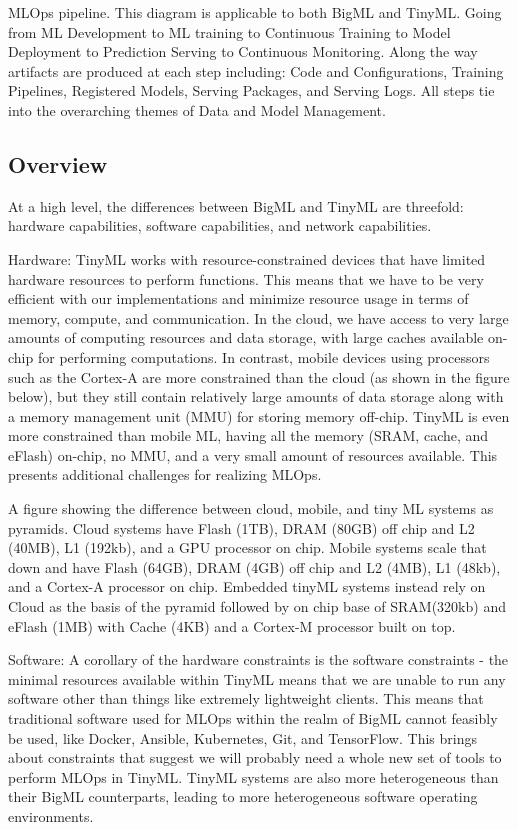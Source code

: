 MLOps pipeline. This diagram is applicable to both BigML and TinyML. Going from ML Development to ML training to Continuous Training to Model Deployment to Prediction Serving to Continuous Monitoring. Along the way artifacts are produced at each step including: Code and Configurations, Training Pipelines, Registered Models, Serving Packages, and Serving Logs. All steps tie into the overarching themes of Data and Model Management.



\subsection{Overview}

At a high level, the differences between BigML and TinyML are threefold: hardware capabilities, software capabilities, and network capabilities. 

Hardware: TinyML works with resource-constrained devices that have limited hardware resources to perform functions. This means that we have to be very efficient with our implementations and minimize resource usage in terms of memory, compute, and communication. In the cloud, we have access to very large amounts of computing resources and data storage, with large caches available on-chip for performing computations. In contrast, mobile devices using processors such as the Cortex-A are more constrained than the cloud (as shown in the figure below), but they still contain relatively large amounts of data storage along with a memory management unit (MMU) for storing memory off-chip. TinyML is even more constrained than mobile ML, having all the memory (SRAM, cache, and eFlash) on-chip, no MMU, and a very small amount of resources available. This presents additional challenges for realizing MLOps.

A figure showing the difference between cloud, mobile, and tiny ML systems as pyramids. Cloud systems have Flash (1TB), DRAM (80GB) off chip and L2 (40MB), L1 (192kb), and a GPU processor on chip. Mobile systems scale that down and have Flash (64GB), DRAM (4GB) off chip and L2 (4MB), L1 (48kb), and a Cortex-A processor on chip. Embedded tinyML systems instead rely on Cloud as the basis of the pyramid followed by on chip base of SRAM(320kb) and eFlash (1MB) with Cache (4KB) and a Cortex-M processor built on top.



Software: A corollary of the hardware constraints is the software constraints - the minimal resources available within TinyML means that we are unable to run any software other than things like extremely lightweight clients. This means that traditional software used for MLOps within the realm of BigML cannot feasibly be used, like Docker, Ansible, Kubernetes, Git, and TensorFlow. This brings about constraints that suggest we will probably need a whole new set of tools to perform MLOps in TinyML. TinyML systems are also more heterogeneous than their BigML counterparts, leading to more heterogeneous software operating environments.

